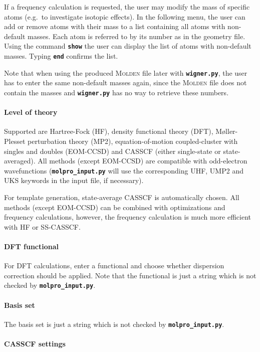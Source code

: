 \documentclass[a4paper,11pt,DIV=15,openany,twoside=false]{scrbook}
\newcommand{\ttt}[1]{\textbf{\texttt{#1}}}
\begin{document}
If a frequency calculation is requested, the user may modify the mass of specific atoms (e.g.\ to investigate isotopic effects). In the following menu, the user can add or remove atoms with their mass to a list containing all atoms with non-default masses. Each atom is referred to by its number as in the geometry file. Using the command \ttt{show} the user can display the list of atoms with non-default masses. Typing \ttt{end} confirms the list.

Note that when using the produced \textsc{Molden} file later with \ttt{wigner.py}, the user has to enter the same non-default masses again, since the \textsc{Molden} file does not contain the masses and \ttt{wigner.py} has no way to retrieve these numbers.

\paragraph{Level of theory}

Supported are Hartree-Fock (HF), density functional theory (DFT), M{\o}ller-Plesset perturbation theory (MP2), equation-of-motion coupled-cluster with singles and doubles (EOM-CCSD) and CASSCF (either single-state or state-averaged). All methods (except EOM-CCSD) are compatible with odd-electron wavefunctions (\ttt{molpro\_input.py} will use the corresponding UHF, UMP2 and UKS keywords in the input file, if necessary).

For template generation, state-average CASSCF is automatically chosen. All methods (except EOM-CCSD) can be combined with optimizations and frequency calculations, however, the frequency calculation is much more efficient with HF or SS-CASSCF. 

\paragraph{DFT functional}

For DFT calculations, enter a functional and choose whether dispersion correction should be applied. Note that the functional is just a string which is not checked by \ttt{molpro\_input.py}. 

\paragraph{Basis set}

The basis set is just a string which is not checked by \ttt{molpro\_input.py}. 

\paragraph{CASSCF settings}
\end{document}
